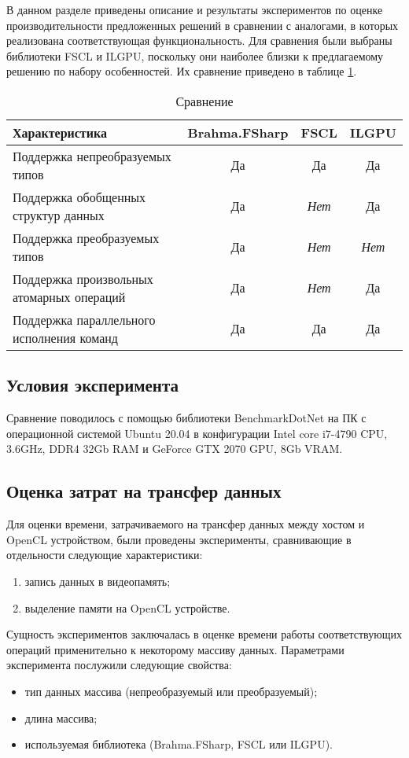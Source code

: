 
В данном разделе приведены описание и результаты экспериментов по оценке производительности предложенных решений в сравнении с аналогами, в которых реализована соответствующая функциональность. Для сравнения были выбраны библиотеки FSCL и ILGPU, поскольку они наиболее близки к предлагаемому решению по набору особенностей. Их сравнение приведено в таблице \ref{tab:comp}.

\begin{table}[h]
    \begin{tabularx}{\textwidth}{|X|c|c|c|}
      \hline
      \textbf{Характеристика} & \textbf{Brahma.FSharp} & \textbf{FSCL} & \textbf{ILGPU} \\
      \hline
      Поддержка непреобразуемых типов & Да & Да & Да \\
      Поддержка обобщенных структур данных & Да & \textit{Нет} & Да \\
      Поддержка преобразуемых типов & Да & \textit{Нет} & \textit{Нет} \\
      Поддержка произвольных атомарных операций & Да & \textit{Нет} & Да \\
      Поддержка параллельного исполнения команд & Да & Да & Да \\
      \hline
    \end{tabularx}
  \caption{Сравнение}
  \label{tab:comp}
\end{table}

\subsection{Условия эксперимента}
Сравнение поводилось с помощью библиотеки BenchmarkDotNet на ПК с операционной
системой Ubuntu 20.04 в конфигурации Intel core i7-4790 CPU,
3.6GHz, DDR4 32Gb RAM и GeForce GTX 2070 GPU, 8Gb VRAM.

\subsection{Оценка затрат на трансфер данных}
Для оценки времени, затрачиваемого на трансфер данных между хостом и OpenCL устройством, были проведены эксперименты, сравнивающие в отдельности следующие характеристики:
\begin{enumerate}
    \item запись данных в видеопамять;
    \item выделение памяти на OpenCL устройстве.
\end{enumerate}
Сущность экспериментов заключалась в оценке времени работы соответствующих операций применительно к некоторому массиву данных. Параметрами эксперимента послужили следующие свойства:
\begin{itemize}
    \item тип данных массива (непреобразуемый или преобразуемый);
    \item длина массива;
    \item используемая библиотека (Brahma.FSharp, FSCL или ILGPU).
\end{itemize}

